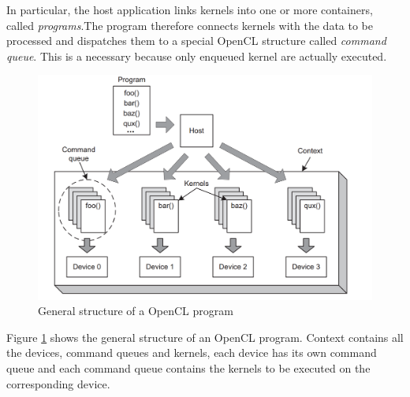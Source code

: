 In particular, the host application links kernels into one or more
containers, called \emph{programs}.The program therefore connects
kernels with the data to be processed and dispatches them to a special
OpenCL structure called \emph{command queue}. This is a necessary
because only enqueued kernel are actually executed.


\begin{figure}[htp]
  \begin{center}
    \includegraphics[width=12cm]{./images/OpenCAL-CL/kernelDistribution}
    \caption{General structure of a OpenCL program}
    \label{fig:GeneralStructure}
  \end{center}
\end{figure}

Figure \ref{fig:GeneralStructure} shows the general structure of an
OpenCL program. Context contains all the devices, command queues
and kernels, each device has its own command queue and each
command queue contains the kernels to be executed on the corresponding
device.

